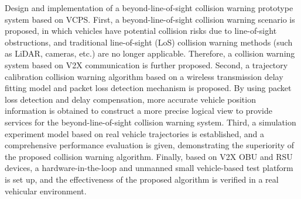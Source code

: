 \begin{eabstract}
 Design and implementation of a beyond-line-of-sight collision warning prototype system based on VCPS.
First, a beyond-line-of-sight collision warning scenario is proposed, in which vehicles have potential collision risks due to line-of-sight obstructions, and traditional line-of-sight (LoS) collision warning methods (such as LiDAR, cameras, etc.) are no longer applicable. 
Therefore, a collision warning system based on V2X communication is further proposed.
Second, a trajectory calibration collision warning algorithm based on a wireless transmission delay fitting model and packet loss detection mechanism is proposed. 
By using packet loss detection and delay compensation, more accurate vehicle position information is obtained to construct a more precise logical view to provide services for the beyond-line-of-sight collision warning system.
Third, a simulation experiment model based on real vehicle trajectories is established, and a comprehensive performance evaluation is given, demonstrating the superiority of the proposed collision warning algorithm.
Finally, based on V2X OBU and RSU devices, a hardware-in-the-loop and unmanned small vehicle-based test platform is set up, and the effectiveness of the proposed algorithm is verified in a real vehicular environment.
 
\end{eabstract}

